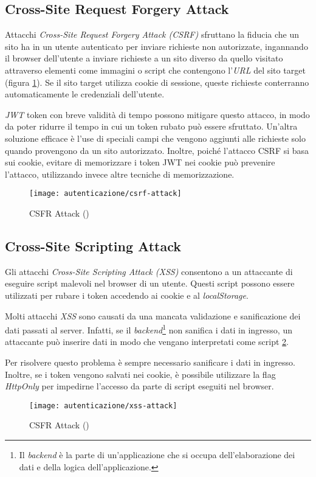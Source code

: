 \subsection{Cross-Site Request Forgery Attack}
Attacchi \emph{Cross-Site Request Forgery Attack (CSRF)} sfruttano la fiducia che un sito ha in un utente autenticato per inviare richieste non autorizzate, ingannando il browser dell'utente a inviare richieste a un sito diverso da quello visitato attraverso elementi come immagini o script che contengono l'\emph{URL} del sito target (figura \ref{fig:csrf-attack}).
Se il sito target utilizza cookie di sessione, queste richieste conterranno automaticamente le credenziali dell'utente.

\emph{JWT} token con breve validità di tempo possono mitigare questo attacco, in modo da poter ridurre il tempo in cui un token rubato può essere sfruttato.
Un'altra soluzione efficace è l'use di speciali campi che vengono aggiunti alle richieste solo quando provengono da un sito autorizzato.
Inoltre, poiché l'attacco CSRF si basa sui cookie, evitare di memorizzare i token JWT nei cookie può prevenire l'attacco, utilizzando invece altre tecniche di memorizzazione.

\begin{figure}[!ht] 
    \centering 
    \texttt{[image: autenticazione/csrf-attack]} 
    \caption{CSFR Attack (\cite{site:csrf-image})}
	\label{fig:csrf-attack}
\end{figure}

\subsection{Cross-Site Scripting Attack}
Gli attacchi \emph{Cross-Site Scripting Attack (XSS)} consentono a un attaccante di eseguire script malevoli nel browser di un utente.
Questi script possono essere utilizzati per rubare i token accedendo ai cookie e al \emph{localStorage}.

Molti attacchi \emph{XSS} sono causati da una mancata validazione e sanificazione dei dati passati al server.
Infatti, se il \emph{backend}\footnote{Il \emph{backend} è la parte di un'applicazione che si occupa dell'elaborazione dei dati e della logica dell'applicazione.} non sanifica i dati in ingresso, un attaccante può inserire dati in modo che vengano interpretati come script \ref{fig:xss-attack}.

Per risolvere questo problema è sempre necessario sanificare i dati in ingresso.
Inoltre, se i token vengono salvati nei cookie, è possibile utilizzare la flag \emph{HttpOnly} per impedirne l'accesso da parte di script eseguiti nel browser.


\begin{figure}[!ht] 
    \centering 
    \texttt{[image: autenticazione/xss-attack]} 
    \caption{CSFR Attack (\cite{site:xss-image})}
	\label{fig:xss-attack}
\end{figure}